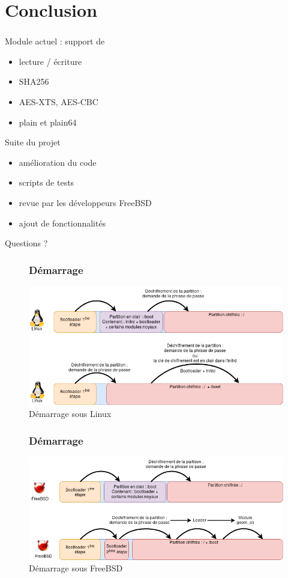 \section{Conclusion}

\begin{frame}
	\frametitle{\insertsectionhead}
	\begin{block}{Module actuel : support de }
		\begin{itemize}
			\item lecture / écriture
			\item SHA256
			\item AES-XTS, AES-CBC
			\item plain et plain64
		\end{itemize}
	\end{block}
	\pause
	\begin{block}{Suite du projet}
		\begin{itemize}
			\item amélioration du code
			\item scripts de tests
			\item revue par les développeurs FreeBSD
			\item ajout de fonctionnalités
		\end{itemize}
	\end{block}
\end{frame}

\begin{frame}
	\centering
	Questions ?
\end{frame}

\begin{frame}
	\begin{figure}
		\frametitle{Démarrage}
		\includegraphics[width=.9\textwidth]{conclusion/DemarrageLinux}
		\caption{Démarrage sous Linux}
	\end{figure}
\end{frame}

\begin{frame}
	\begin{figure}
		\frametitle{Démarrage}
		\includegraphics[width=.9\textwidth]{conclusion/DemarrageFreeBSD}
		\caption{Démarrage sous FreeBSD}
	\end{figure}
\end{frame}
